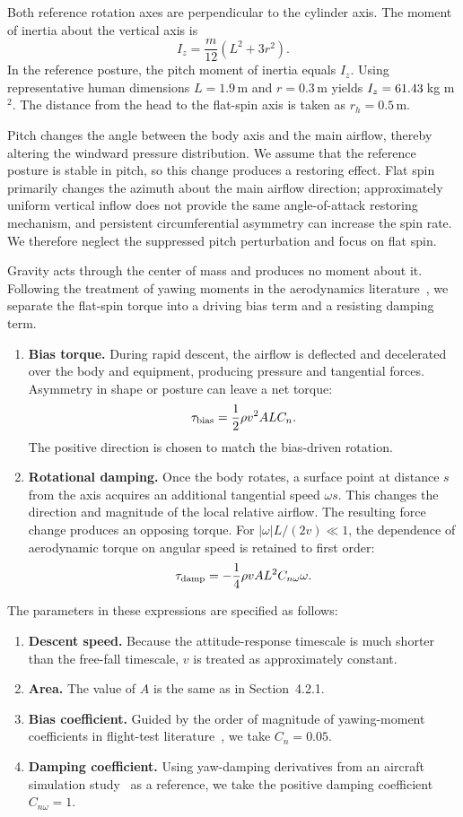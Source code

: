 \documentclass[12pt,a4paper]{article}
\numberwithin{equation}{section}
\begin{document}
\par
Both reference rotation axes are perpendicular to the cylinder axis. The moment of inertia about the vertical axis is
\[
 I_z=\frac{m}{12}(L^2+3r^2).
\]
In the reference posture, the pitch moment of inertia equals $I_z$. Using representative human dimensions $L=1.9$\,m and $r=0.3$\,m yields $I_z=61.43$\,kg m$^2$. The distance from the head to the flat-spin axis is taken as $r_h=0.5$\,m.

Pitch changes the angle between the body axis and the main airflow, thereby altering the windward pressure distribution. We assume that the reference posture is stable in pitch, so this change produces a restoring effect. Flat spin primarily changes the azimuth about the main airflow direction; approximately uniform vertical inflow does not provide the same angle-of-attack restoring mechanism, and persistent circumferential asymmetry can increase the spin rate. We therefore neglect the suppressed pitch perturbation and focus on flat spin.

Gravity acts through the center of mass and produces no moment about it. Following the treatment of yawing moments in the aerodynamics literature~\cite[p.~39]{nguyen}, we separate the flat-spin torque into a driving bias term and a resisting damping term.
\begin{enumerate}
\item \textbf{Bias torque.} During rapid descent, the airflow is deflected and decelerated over the body and equipment, producing pressure and tangential forces. Asymmetry in shape or posture can leave a net torque:
\[
 \tau_{\rm bias}=\frac12\rho v^2ALC_n.
\]
The positive direction is chosen to match the bias-driven rotation.
\item \textbf{Rotational damping.} Once the body rotates, a surface point at distance $s$ from the axis acquires an additional tangential speed $\omega s$. This changes the direction and magnitude of the local relative airflow. The resulting force change produces an opposing torque. For $|\omega|L/(2v)\ll1$, the dependence of aerodynamic torque on angular speed is retained to first order:
\[
 \tau_{\rm damp}=-\frac14\rho vAL^2C_{n\omega}\omega.
\]

\end{enumerate}

The parameters in these expressions are specified as follows:
\begin{enumerate}
\item \textbf{Descent speed.} Because the attitude-response timescale is much shorter than the free-fall timescale, $v$ is treated as approximately constant.
\item \textbf{Area.} The value of $A$ is the same as in Section~4.2.1.
\item \textbf{Bias coefficient.} Guided by the order of magnitude of yawing-moment coefficients in flight-test literature~\cite[p.~6]{cobleigh}, we take $C_n=0.05$.
\item \textbf{Damping coefficient.} Using yaw-damping derivatives from an aircraft simulation study~\cite[p.~81]{nguyen} as a reference, we take the positive damping coefficient $C_{n\omega}=1$.
\end{enumerate}
\end{document}

